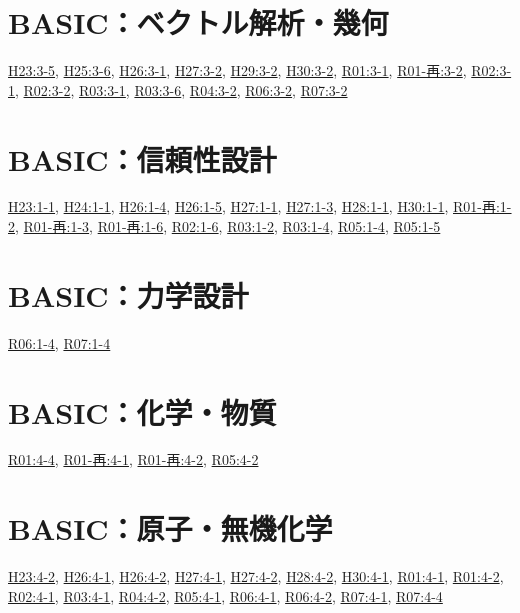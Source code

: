 \section{BASIC：ベクトル解析・幾何}
\hyperref[q:h23-reg-basic-3-5]{H23:3-5}, \hyperref[q:h25-reg-basic-3-6]{H25:3-6}, \hyperref[q:h26-reg-basic-3-1]{H26:3-1}, \hyperref[q:h27-reg-basic-3-2]{H27:3-2}, \hyperref[q:h29-reg-basic-3-2]{H29:3-2}, \hyperref[q:h30-reg-basic-3-2]{H30:3-2}, \hyperref[q:r01-reg-basic-3-1]{R01:3-1}, \hyperref[q:r01-ret-basic-3-2]{R01-再:3-2}, \hyperref[q:r02-reg-basic-3-1]{R02:3-1}, \hyperref[q:r02-reg-basic-3-2]{R02:3-2}, \hyperref[q:r03-reg-basic-3-1]{R03:3-1}, \hyperref[q:r03-reg-basic-3-6]{R03:3-6}, \hyperref[q:r04-reg-basic-3-2]{R04:3-2}, \hyperref[q:r06-reg-basic-3-2]{R06:3-2}, \hyperref[q:r07-reg-basic-3-2]{R07:3-2}
\section{BASIC：信頼性設計}
\hyperref[q:h23-reg-basic-1-1]{H23:1-1}, \hyperref[q:h24-reg-basic-1-1]{H24:1-1}, \hyperref[q:h26-reg-basic-1-4]{H26:1-4}, \hyperref[q:h26-reg-basic-1-5]{H26:1-5}, \hyperref[q:h27-reg-basic-1-1]{H27:1-1}, \hyperref[q:h27-reg-basic-1-3]{H27:1-3}, \hyperref[q:h28-reg-basic-1-1]{H28:1-1}, \hyperref[q:h30-reg-basic-1-1]{H30:1-1}, \hyperref[q:r01-ret-basic-1-2]{R01-再:1-2}, \hyperref[q:r01-ret-basic-1-3]{R01-再:1-3}, \hyperref[q:r01-ret-basic-1-6]{R01-再:1-6}, \hyperref[q:r02-reg-basic-1-6]{R02:1-6}, \hyperref[q:r03-reg-basic-1-2]{R03:1-2}, \hyperref[q:r03-reg-basic-1-4]{R03:1-4}, \hyperref[q:r05-reg-basic-1-4]{R05:1-4}, \hyperref[q:r05-reg-basic-1-5]{R05:1-5}
\section{BASIC：力学設計}
\hyperref[q:r06-reg-basic-1-4]{R06:1-4}, \hyperref[q:r07-reg-basic-1-4]{R07:1-4}
\section{BASIC：化学・物質}
\hyperref[q:r01-reg-basic-4-4]{R01:4-4}, \hyperref[q:r01-ret-basic-4-1]{R01-再:4-1}, \hyperref[q:r01-ret-basic-4-2]{R01-再:4-2}, \hyperref[q:r05-reg-basic-4-2]{R05:4-2}
\section{BASIC：原子・無機化学}
\hyperref[q:h23-reg-basic-4-2]{H23:4-2}, \hyperref[q:h26-reg-basic-4-1]{H26:4-1}, \hyperref[q:h26-reg-basic-4-2]{H26:4-2}, \hyperref[q:h27-reg-basic-4-1]{H27:4-1}, \hyperref[q:h27-reg-basic-4-2]{H27:4-2}, \hyperref[q:h28-reg-basic-4-2]{H28:4-2}, \hyperref[q:h30-reg-basic-4-1]{H30:4-1}, \hyperref[q:r01-reg-basic-4-1]{R01:4-1}, \hyperref[q:r01-reg-basic-4-2]{R01:4-2}, \hyperref[q:r02-reg-basic-4-1]{R02:4-1}, \hyperref[q:r03-reg-basic-4-1]{R03:4-1}, \hyperref[q:r04-reg-basic-4-2]{R04:4-2}, \hyperref[q:r05-reg-basic-4-1]{R05:4-1}, \hyperref[q:r06-reg-basic-4-1]{R06:4-1}, \hyperref[q:r06-reg-basic-4-2]{R06:4-2}, \hyperref[q:r07-reg-basic-4-1]{R07:4-1}, \hyperref[q:r07-reg-basic-4-4]{R07:4-4}
